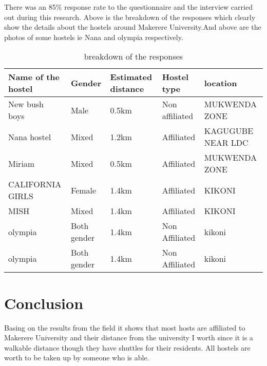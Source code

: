 \documentclass{article}
\begin{document}
There was an 85\% response rate to the questionnaire and the interview carried out during this research. Above  is the breakdown of the responses which clearly show the details about the hostels around Makerere University.And above are the photos of some hostels ie Nana and olympia respectively.

\begin{table}[]
\centering
\caption{breakdown of the responses }
\label{my-label}
\begin{tabular}{|l|l|l|l|l|}
\hline
Name of the hostel & Gender  & Estimated distance & Hostel type   & location  \\ \hline
New bush boys        &  Male                  & 0.5km                    & Non affiliated & MUKWENDA ZONE             \\ \hline
Nana hostel &  Mixed                & 1.2km                    &  Affiliated   & 	KAGUGUBE NEAR LDC                   \\ \hline
Miriam        & Mixed                & 0.5km                    &  Affiliated    &    MUKWENDA ZONE              \\ \hline
CALIFORNIA GIRLS  &  Female        &  1.4km                  & Affiliated     & KIKONI      \\ \hline
MISH                    & Mixed        &  1.4km                  & Affiliated         &KIKONI  \\ \hline
olympia                    &  Both  gender        &  1.4km                  & Non Affiliated   &  kikoni      \\ \hline
olympia                    &  Both  gender        &  1.4km                  & Non Affiliated    &   kikoni    \\ \hline

\end{tabular}
\end{table}
 
 
\section{Conclusion}\label{sec:into}

Basing on the results from the field it shows that most hosts are affiliated to Makerere University and their distance from the university I worth since it is a walkable distance though they have shuttles for their residents. All hostels are worth to be taken up by someone who is able.
\end{document}
